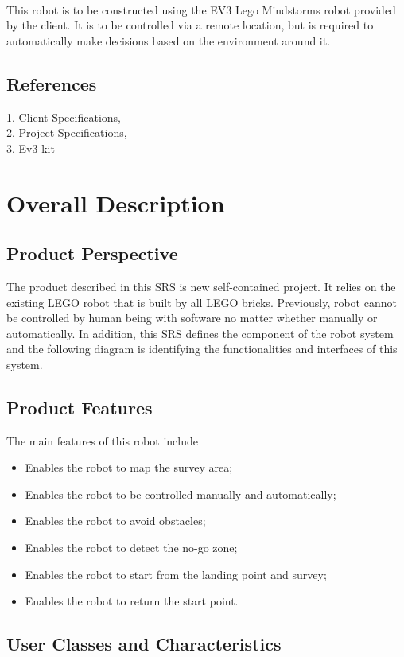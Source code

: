 \documentclass[10pt,a4paper,titlepage]{article}
\begin{document}
	\paragraph{}
This robot is to be constructed using the EV3 Lego Mindstorms robot provided by the client. It is to be controlled via a remote location, but is required to automatically make decisions based on the environment around it.

	\subsection{References}
1. Client Specifications, \\
2. Project Specifications, \\
3. Ev3 kit
	
	\section{Overall Description}
	\subsection{Product Perspective}
The product described in this SRS is new self-contained project. It relies on the existing LEGO robot that is built by all LEGO bricks. Previously, robot cannot be controlled by human being with software no matter whether manually or automatically. In addition, this SRS defines the component of the robot system and the following diagram is identifying the functionalities and interfaces of this system.
	

	\subsection{Product Features}
The main features of this robot include
\begin{itemize}
\item Enables the robot to map the survey area;
\item Enables the robot to be controlled manually and automatically;
\item Enables the robot to avoid obstacles;
\item Enables the robot to detect the no-go zone;
\item Enables the robot to start from the landing point and survey;
\item Enables the robot to return the start point.
\end{itemize}

	\subsection{User Classes and Characteristics}
\end{document}
